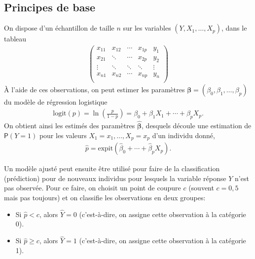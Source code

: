 \documentclass[
  11pt,
  letterpaper,
]{book}
\providecommand{\tightlist}{%
  \setlength{\itemsep}{0pt}\setlength{\parskip}{0pt}}
\theoremstyle{definition}
\theoremstyle{definition}
\theoremstyle{definition}
\theoremstyle{remark}
\begin{document}
\hypertarget{principes-de-base}{%
\subsection{Principes de base}\label{principes-de-base}}

On dispose d'un échantillon de taille \(n\) sur les variables \((Y, X_1, \ldots, X_p)\), dans le tableau
\begin{align*}
 \begin{pmatrix}
 x_{11} & x_{12} & \cdots & x_{1p} & y_1 \\
 x_{21} & \ddots & \cdots & x_{2p} & y_2 \\
 \vdots & \ddots & \ddots & \ddots & \vdots \\
 x_{n1} & x_{n2} & \cdots & x_{np} & y_n \\
 \end{pmatrix}
\end{align*}
À l'aide de ces observations, on peut estimer les paramètres \(\boldsymbol{\beta} = (\beta_0, \beta_1 ,\ldots, \beta_p)\) du modèle de régression logistique
\begin{align*}
\mathrm{logit}(p) = \ln \left( \frac{p}{1-p}\right) = \beta_0 + \beta_1 X_1 + \cdots + \beta_pX_p.
\end{align*}
On obtient ainsi les estimés des paramètres \(\widehat{\boldsymbol{\beta}}\), desquels découle une estimation de \({\mathsf P}\left(Y=1\right)\) pour les valeurs \(X_1=x_1, \ldots, X_p=x_p\) d'un individu donné,
\begin{align*}
 \widehat{p} = \mathrm{expit}(\widehat{\beta}_0 + \cdots + \widehat{\beta}_pX_p).
\end{align*}

Un modèle ajusté peut ensuite être utilisé pour faire de la classification (prédiction) pour de nouveaux individus pour lesquels la variable réponse \(Y\) n'est pas observée. Pour ce faire, on choisit un point de coupure \(c\) (souvent \(c=0,5\) mais pas toujours) et on classifie les observations en deux groupes:

\begin{itemize}
\tightlist
\item
  Si \(\widehat{p}< c\), alors \(\widehat{Y}=0\) (c'est-à-dire, on assigne cette observation à la catégorie 0).
\item
  Si \(\widehat{p} \geq c\), alors \(\widehat{Y}=1\) (c'est-à-dire, on assigne cette observation à la catégorie 1).
\end{itemize}
\end{document}
